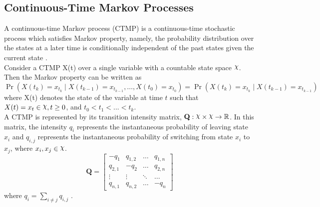 \subsection{Continuous-Time Markov Processes}
A continuous-time Markov process (CTMP) is a continuous-time stochastic process which satisfies Markov property, namely, the probability distribution over the states at a later time is conditionally independent of the past states given the current state \cite{Cohn2010a}. \\
Consider a CTMP X(t) over a single variable with a countable state space $ \rchi $. Then the Markov property can be written as
\begin{equation}
\operatorname{Pr}\left(X(t_{k})=x_{t_{k}} \mid X(t_{k-1})=x_{t_{k-1}}, \ldots, X(t_{0})=x_{t_{0}}\right)=\operatorname{Pr}\left(X(t_{k})=x_{t_{k}} \mid X(t_{k-1})=x_{t_{k-1}}\right)
\end{equation}
where X(t) denotes the state of the variable at time $ t $ such that $ X(t)=x_t \in \rchi, t \geq 0$, and $ t_0<t_1<...<t_k $.\\
A CTMP is represented by its transition intensity matrix, $ \textbf{Q} : \rchi \times \rchi \rightarrow \mathbb{R}$. In this matrix, the intensity $ q_{i} $ represents the instantaneous probability of leaving state $ x_{i} $ and $ q_{i,j} $ represents the instantaneous probability of switching from state $ x_{i} $ to $ x_{j} $, where $ x_i, x_j \in \rchi $. 
\begin{equation}
\textbf{Q} = 
\begin{bmatrix}
-q_{1} & q_{1,2} &     {\hdots}  & q_{1,n} \\
q_{2,1} & -q_{2} &     {\hdots}  & q_{2,n}  \\
{\vdots}  &     {\vdots}  &     {\ddots}  & {\hdots}  \\
q_{n,1} &  q_{n,2} &  {\hdots} & -q_{n}
\end{bmatrix}
\label{eq:Q_matrix}
\end{equation}
where $ q_{i} = \sum_{i \neq j} q_{i,j}$ \cite{Nodelman1995}.

